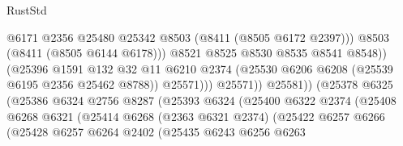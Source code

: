 \begin{lexlean}{RustStd}
\begin{coremodule}
                                                @6171
                                                @2356
                                                @25480
                                                @25342
                                                @8503
                                                (@8411 (@8505 @6172 @2397)))
                                              @8503
                                              (@8411 (@8505 @6144 @6178)))
                                            @8521
                                            @8525
                                            @8530
                                            @8535
                                            @8541
                                            @8548))
                                        (@25396
                                          @1591
                                          @132
                                          @32
                                          @11
                                          @6210
                                          @2374
                                          (@25530 @6206 @6208 (@25539 @6195 @2356 @25462 @8788))
                                          @25571)))
                                    @25571))
                                @25581))
                            (@25378
                              @6325
                              (@25386
                                @6324
                                @2756
                                @8287
                                (@25393
                                  @6324
                                  (@25400
                                    @6322
                                    @2374
                                    (@25408
                                      @6268
                                      @6321
                                      (@25414
                                        @6268
                                        (@2363 @6321 @2374)
                                        (@25422
                                          @6257
                                          @6266
                                          (@25428
                                            @6257
                                            @6264
                                            @2402
                                            (@25435
                                              @6243
                                              @6256
                                              @6263

\end{coremodule}
\end{lexlean}
